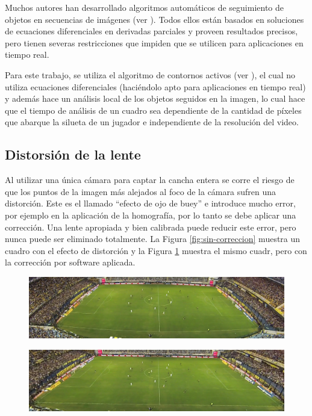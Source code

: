 Muchos autores han desarrollado algoritmos automáticos de seguimiento de
objetos en secuencias de imágenes (ver \cite{IFTrace, alp, local-learning,
MHT-2}). Todos ellos están basados en soluciones de ecuaciones diferenciales en
derivadas parciales y proveen resultados precisos, pero tienen severas
restricciones que impiden que se utilicen para aplicaciones en tiempo real.

Para este trabajo, se utiliza el algoritmo de contornos activos (ver
\cite{fast-level-set}), el cual no utiliza ecuaciones diferenciales (haciéndolo
apto para aplicaciones en tiempo real) y además hace un análisis local de los
objetos seguidos en la imagen, lo cual hace que el tiempo de análisis de un
cuadro sea dependiente de la cantidad de píxeles que abarque la silueta de un
jugador e independiente de la resolución del video.

\subsection{Distorsión de la lente}

Al utilizar una única cámara para captar la cancha entera se corre el riesgo de
que los puntos de la imagen más alejados al foco de la cámara sufren una
distorción. Este es el llamado ``efecto de ojo de buey'' e introduce mucho
error, por ejemplo en la aplicación de la homografía, por lo tanto se debe
aplicar una corrección. Una lente apropiada y bien calibrada puede reducir este
error, pero nunca puede ser eliminado totalmente. La Figura
\ref{fig:sin-correccion} muestra un cuadro con el efecto de distorción y la
Figura \ref{fig:con-correccion} muestra el mismo cuadr, pero con la corrección
por software aplicada.

\begin{figure}[H]
    \centering
    \includegraphics[width=.8\linewidth]{./images/sin-correccion.png}
    \label{fig:sin-correccion}
\begin{figure}[H]
\end{figure}
    \centering
    \includegraphics[width=.8\linewidth]{./images/con-correccion.png}
    \label{fig:con-correccion}
\end{figure}


